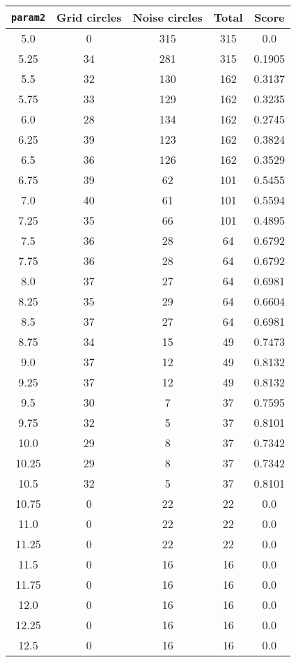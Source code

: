 \documentclass[letterpaper, 12pt]{article}
\begin{document}
\begin{longtable}{|c|c|c|c|c|}
\hline
\textbf{\texttt{param2}} & \textbf{Grid circles} & \textbf{Noise circles} & \textbf{Total} & \textbf{Score} \\
\hline
5.0 & 0 & 315 & 315 & 0.0 \\
\hline
5.25 & 34 & 281 & 315 & 0.1905 \\
\hline
5.5 & 32 & 130 & 162 & 0.3137 \\
\hline
5.75 & 33 & 129 & 162 & 0.3235 \\
\hline
6.0 & 28 & 134 & 162 & 0.2745 \\
\hline
6.25 & 39 & 123 & 162 & 0.3824 \\
\hline
6.5 & 36 & 126 & 162 & 0.3529 \\
\hline
6.75 & 39 & 62 & 101 & 0.5455 \\
\hline
7.0 & 40 & 61 & 101 & 0.5594 \\
\hline
7.25 & 35 & 66 & 101 & 0.4895 \\
\hline
7.5 & 36 & 28 & 64 & 0.6792 \\
\hline
7.75 & 36 & 28 & 64 & 0.6792 \\
\hline
8.0 & 37 & 27 & 64 & 0.6981 \\
\hline
8.25 & 35 & 29 & 64 & 0.6604 \\
\hline
8.5 & 37 & 27 & 64 & 0.6981 \\
\hline
8.75 & 34 & 15 & 49 & 0.7473 \\
\hline
9.0 & 37 & 12 & 49 & 0.8132 \\
\hline
9.25 & 37 & 12 & 49 & 0.8132 \\
\hline
9.5 & 30 & 7 & 37 & 0.7595 \\
\hline
9.75 & 32 & 5 & 37 & 0.8101 \\
\hline
10.0 & 29 & 8 & 37 & 0.7342 \\
\hline
10.25 & 29 & 8 & 37 & 0.7342 \\
\hline
10.5 & 32 & 5 & 37 & 0.8101 \\
\hline
10.75 & 0 & 22 & 22 & 0.0 \\
\hline
11.0 & 0 & 22 & 22 & 0.0 \\
\hline
11.25 & 0 & 22 & 22 & 0.0 \\
\hline
11.5 & 0 & 16 & 16 & 0.0 \\
\hline
11.75 & 0 & 16 & 16 & 0.0 \\
\hline
12.0 & 0 & 16 & 16 & 0.0 \\
\hline
12.25 & 0 & 16 & 16 & 0.0 \\
\hline
12.5 & 0 & 16 & 16 & 0.0 \\

\end{longtable}
\end{document}
